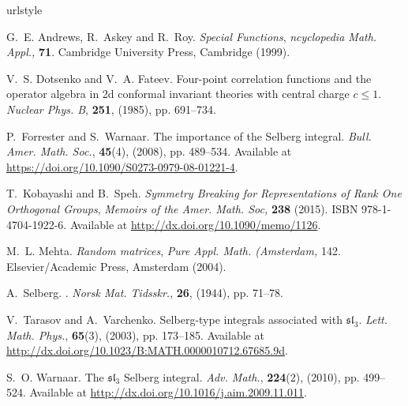 \documentclass[10pt]{article} %
\title{}
\author{}
\date{}
\begin{document}
	\maketitle

\nocite{kobayashi2015symmetry}
\nocite{Selberg:411367}
\nocite{andrews1999special}
\nocite{dotsenko1985four}
\nocite{tarasov2003selberg}
\nocite{warnaar2010sl3}
\nocite{mehta2004random}
\nocite{forrester2008importance}

\small
\begin{thebibliography}{9}
\expandafter\ifx\csname urlstyle\endcsname\relax
  \providecommand{\doi}[1]{doi:\discretionary{}{}{}#1}\else
  \providecommand{\doi}{doi:\discretionary{}{}{}\begingroup
  \urlstyle{rm}\Url}\fi

G.~E. Andrews, R.~Askey and R.~Roy.
\newblock \emph{Special {F}unctions}, \emph{{ncyclopedia {M}ath.
  {A}ppl.},} \textbf{71}.
\newblock Cambridge University Press, Cambridge (1999).

V.~S. Dotsenko and V.~A. Fateev.
\newblock Four-point correlation functions and the operator algebra in 2d
  conformal invariant theories with central charge $c\leq 1$.
\newblock \emph{{N}uclear {P}hys. B}, \textbf{251}, (1985), pp. 691--734.

P.~Forrester and S.~Warnaar.
\newblock The importance of the {S}elberg integral.
\newblock \emph{Bull. Amer. Math. Soc.}, \textbf{45}(4), (2008), pp. 489--534.
\newblock Available at \url{https://doi.org/10.1090/S0273-0979-08-01221-4}.

T.~Kobayashi and B.~Speh.
\newblock \emph{Symmetry {B}reaking for {R}epresentations of {R}ank {O}ne
  {O}rthogonal {G}roups}, \emph{{\normalfont Memoirs of the Amer. Math. Soc},}
  \textbf{238} (2015).
\newblock ISBN 978-1-4704-1922-6.
\newblock Available at \url{http://dx.doi.org/10.1090/memo/1126}.

M.~L. Mehta.
\newblock \emph{Random matrices}, \emph{{\normalfont Pure Appl. Math.
  ({A}msterdam},} 142.
\newblock Elsevier/{A}cademic {P}ress, {A}msterdam (2004).

A.~Selberg.
.
\newblock \emph{Norsk Mat. Tidsskr.}, \textbf{26}, (1944), pp. 71--78.

V.~Tarasov and A.~Varchenko.
\newblock Selberg-type integrals associated with $\mathfrak{sl}_3$.
\newblock \emph{Lett. Math. Phys.}, \textbf{65}(3), (2003), pp. 173--185.
\newblock Available at
  \url{http://dx.doi.org/10.1023/B:MATH.0000010712.67685.9d}.

S.~O. Warnaar.
\newblock The $\mathfrak{sl}_3$ {S}elberg integral.
\newblock \emph{Adv. Math.}, \textbf{224}(2), (2010), pp. 499--524.
\newblock Available at \url{http://dx.doi.org/10.1016/j.aim.2009.11.011}.

\end{thebibliography}
\end{document}
